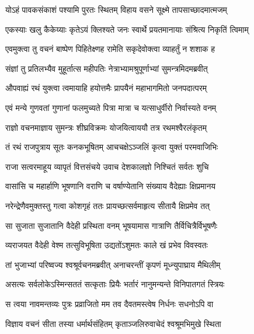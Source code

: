 \twolineshloka
{योऽहं पावकसंकाशं पश्यामि पुरतः स्थितम्}
{विहाय वसने सूक्ष्मे तापसाच्छादमात्मजम्} %

\twolineshloka
{एकस्याः खलु कैकेय्याः कृतेऽयं क्लिश्यते जनः}
{स्वार्थे प्रयतमानायाः संश्रित्य निकृतिं त्विमाम्} %

\twolineshloka
{एवमुक्त्वा तु वचनं बाष्पेण पिहितेक्ष्णह}
{रामेति सकृदेवोक्त्वा व्याहर्तुं न शशाक ह} %

\twolineshloka
{संज्ञां तु प्रतिलभ्यैव मुहूर्तात्स महीपतिः}
{नेत्राभ्यामश्रुपूर्णाभ्यां सुमन्त्रमिदमब्रवीत्} %

\twolineshloka
{औपवाह्यं रथं युक्त्वा त्वमायाहि हयोत्तमैः}
{प्रापयैनं महाभागमितो जनपदात्परम्} %

\twolineshloka
{एवं मन्ये गुणवतां गुणानां फलमुच्यते}
{पित्रा मात्रा च यत्साधुर्वीरो निर्वास्यते वनम्} %

\twolineshloka
{राज्ञो वचनमाज्ञाय सुमन्त्रः शीघ्रविक्रमः}
{योजयित्वाययौ तत्र रथमश्वैरलंकृतम्} %

\twolineshloka
{तं रथं राजपुत्राय सूतः कनकभूषितम्}
{आचचक्षेऽञ्जलिं कृत्वा युक्तं परमवाजिभिः} %

\twolineshloka
{राजा सत्वरमाहूय व्यापृतं वित्तसंचये}
{उवाच देशकालज्ञो निश्चितं सर्वतः शुचि} %

\twolineshloka
{वासांसि च महार्हाणि भूषणानि वराणि च}
{वर्षाण्येतानि संख्याय वैदेह्याः क्षिप्रमानय} %

\twolineshloka
{नरेन्द्रेणैवमुक्तस्तु गत्वा कोशगृहं ततः}
{प्रायच्छत्सर्वमाहृत्य सीतायै क्षिप्रमेव तत्} %

\twolineshloka
{सा सुजाता सुजातानि वैदेही प्रस्थिता वनम्}
{भूषयामास गात्राणि तैर्विचित्रैर्विभूषणैः} %

\twolineshloka
{व्यराजयत वैदेही वेश्म तत्सुविभूषिता}
{उद्यतोंऽशुमतः काले खं प्रभेव विवस्वतः} %

\twolineshloka
{तां भुजाभ्यां परिष्वज्य श्वश्रूर्वचनमब्रवीत्}
{अनाचरन्तीं कृपणं मूध्न्युपाघ्राय मैथिलीम्} %

\twolineshloka
{असत्यः सर्वलोकेऽस्मिन्सततं सत्कृताः प्रियैः}
{भर्तारं नानुमन्यन्ते विनिपातगतं स्त्रियः} %

\twolineshloka
{स त्वया नावमन्तव्यः पुत्रः प्रव्राजितो मम}
{तव दैवतमस्त्वेष निर्धनः सधनोऽपि वा} %

\twolineshloka
{विज्ञाय वचनं सीता तस्या धर्मार्थसंहितम्}
{कृताञ्जलिरुवाचेदं श्वश्रूमभिमुखे स्थिता} %

